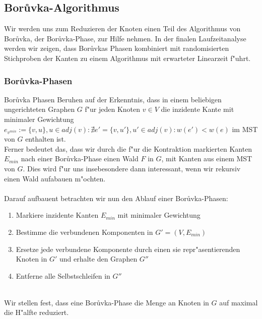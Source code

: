 \subsection{Bor\r uvka-Algorithmus}

Wir werden uns zum Reduzieren der Knoten einen Teil des Algorithmus von Bor\r uvka, 
    der Bor\r uvka-Phase, zur Hilfe nehmen. In der finalen Laufzeitanalyse
    werden wir zeigen, dass Bor\r uvkas Phasen kombiniert mit randomisierten
    Stichproben der Kanten zu einem Algorithmus mit erwarteter Linearzeit f"uhrt.\\

\subsubsection{Bor\r uvka-Phasen}

Bor\r uvka Phasen Beruhen auf der Erkenntnis, dass in einem beliebigen 
    ungerichteten Graphen $G$ f"ur jeden Knoten $v \in V$ die inzidente Kante mit 
    minimaler Gewichtung 
    $e_{v^{min}} := \{v, u\}, u \in adj(v): 
        \nexists e' = \{v, u'\}, u' \in adj(v): w(e') < w(e)$
    im MST von $G$ enthalten ist.\\
Ferner bedeutet das, dass wir durch die f"ur die Kontraktion markierten Kanten
    $E_{min}$ nach einer Bor\r uvka-Phase einen Wald $F$ in $G$, mit Kanten aus 
    einem MST von $G$. Dies wird f"ur uns insebesondere dann interessant, wenn
    wir rekursiv einen Wald aufabauen m"ochten.\\
\\
Darauf aufbauent betrachten wir nun den Ablauf einer Bor\r uvka-Phasen:
\begin{enumerate}
    \item Markiere inzidente Kanten $E_{min}$ mit minimaler Gewichtung
    \item Bestimme die verbundenen Komponenten in $G' = (V,E_{min})$
    \item Ersetze jede verbundene Komponente durch einen sie repr"asentierenden
          Knoten in $G'$ und erhalte den Graphen $G''$
    \item Entferne alle Selbstschleifen in $G''$
\end{enumerate}
\ \\
Wir stellen fest, dass eine Bor\r uvka-Phase die Menge an Knoten in $G$ auf 
    maximal die H"alfte reduziert.\\
